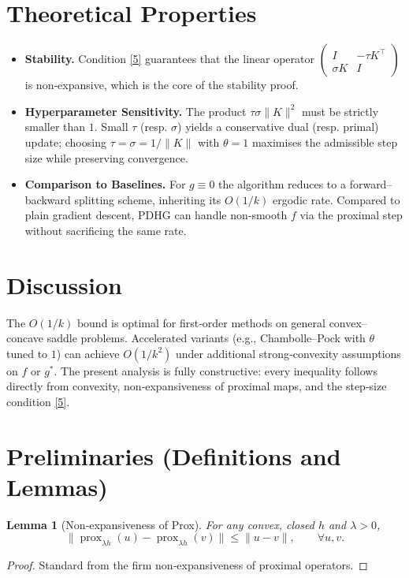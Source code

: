 \documentclass{article}
\newtheorem{lemma}{Lemma}
\newcommand{\prox}{\operatorname{prox}}
\newcommand{\norm}[1]{\|#1\|}
\begin{document}
\section*{Theoretical Properties}
\begin{itemize}[noitemsep]
\item \textbf{Stability.} Condition \eqref{5} guarantees that the linear operator
\(
\begin{pmatrix}
I & -\tau K^{\top}\\
\sigma K & I
\end{pmatrix}
\)
is non‑expansive, which is the core of the stability proof.
\item \textbf{Hyperparameter Sensitivity.} The product $\tau\sigma\|K\|^{2}$ must be strictly smaller than $1$. Small $\tau$ (resp. $\sigma$) yields a conservative dual (resp. primal) update; choosing $\tau=\sigma=1/\|K\|$ with $\theta=1$ maximises the admissible step size while preserving convergence.
\item \textbf{Comparison to Baselines.} For $g\equiv0$ the algorithm reduces to a forward–backward splitting scheme, inheriting its $O(1/k)$ ergodic rate. Compared to plain gradient descent, PDHG can handle non‑smooth $f$ via the proximal step without sacrificing the same rate.
\end{itemize}

\section*{Discussion}
The $O(1/k)$ bound is optimal for first‑order methods on general convex–concave saddle problems. Accelerated variants (e.g., Chambolle–Pock with $\theta$ tuned to $1$) can achieve $O(1/k^{2})$ under additional strong‑convexity assumptions on $f$ or $g^{*}$. The present analysis is fully constructive: every inequality follows directly from convexity, non‑expansiveness of proximal maps, and the step‑size condition \eqref{5}.

\section*{Preliminaries (Definitions and Lemmas)}
\begin{lemma}[Non‑expansiveness of Prox]\label{lem:prox}
For any convex, closed $h$ and $\lambda>0$,
\[
\norm{\prox_{\lambda h}(u)-\prox_{\lambda h}(v)}\le \norm{u-v},\qquad\forall u,v.
\tag{8}
\]
\end{lemma}
\begin{proof}
Standard from the firm non‑expansiveness of proximal operators. \qedhere
\end{proof}
\end{document}
